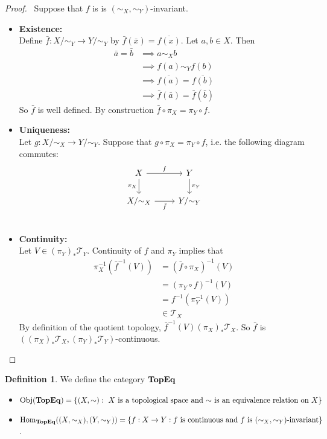 \documentclass[12pt]{amsart}
\theoremstyle{definition}
\newtheorem{defn}[definition]{Definition}
\newcommand{\MT}{\mathcal{T}}
\newcommand{\tbf}[1]{\textbf{#1}}
\newcommand{\ol}[1]{\overline{#1}}
\DeclareMathOperator{\Obj}{Obj}
\DeclareMathOperator{\Hom}{Hom}
\DeclareMathOperator*{\0}{\mbf{0}}
\DeclareMathOperator*{\1}{\mbf{1}}
\DeclareMathOperator*{\TopEq}{\text{\tbf{TopEq}}}
\begin{document}
	\begin{proof}\
	Suppose that $f$ is is $(\sim_X, \sim_Y)$-invariant. 
	\begin{itemize}
		\item \tbf{Existence:} \\
			Define $\bar{f}: X / {\sim_Y} \rightarrow Y/{\sim_Y}$ by $\bar{f}(\bar{x}) = \ol{f(x)}$. Let $a,b \in X$. Then 
		\begin{align*}
			\bar{a} = \bar{b}
			& \implies a \sim_X b \\
			& \implies f(a) \sim_Y f(b) \\
			& \implies \overline{f(a)} = \overline{f(b)} \\
			& \implies \bar{f}(\bar{a}) = \bar{f}(\bar{b}) 
		\end{align*}
		So $\bar{f}$ is well defined. By construction $\bar{f} \circ \pi_X = \pi_Y \circ f$.
		\item \tbf{Uniqueness:} \\
		Let $g: X / {\sim}_X \rightarrow Y/ {\sim_Y}$. Suppose that $g \circ \pi_X = \pi_Y \circ f$, i.e. the following diagram commutes:
		\[ 
		\begin{tikzcd}
			X  \arrow[r, "f"]  \arrow[d, "\pi_X"']  & Y   \arrow[d, "\pi_Y"]\\
			X/ {\sim_X} \arrow[r, "\bar{f}"'] &  Y / {\sim_Y} \\
		\end{tikzcd}
		\]
		\item  \tbf{Continuity:} \\
		Let $V \in (\pi_Y)_* \MT_Y$. Continuity of $f$ and $\pi_Y$ implies that 
		\begin{align*}
			\pi_X^{-1}(\bar{f}^{-1}(V))
			& = (\bar{f} \circ \pi_X)^{-1}(V) \\
			& = (\pi_Y \circ f)^{-1}(V) \\
			& = f^{-1}(\pi_Y^{-1}(V)) \\
			& \in \MT_X
		\end{align*}
		By definition of the quotient topology, $\bar{f}^{-1}(V) (\pi_X)_*\MT_X$. So $\bar{f}$ is $((\pi_X)_*\MT_X, (\pi_Y)_*\MT_Y)$-continuous.
	\end{itemize}

	\end{proof}

	\begin{defn}
		We define the category $\TopEq$ 
		\begin{itemize}
			\item $\Obj(\TopEq) = \{(X, \sim):  \text{ $X$ is a topological space and $\sim$ is an equivalence relation on $X$}\}$
			\item $\Hom_{\TopEq}((X, \sim_X), (Y, \sim_Y)) = \{f: X \rightarrow Y: \text{$f$ is continuous and $f$ is $(\sim_X, \sim_Y)$-invariant}\}$. 
		\end{itemize}
	\end{defn}
\end{document}
